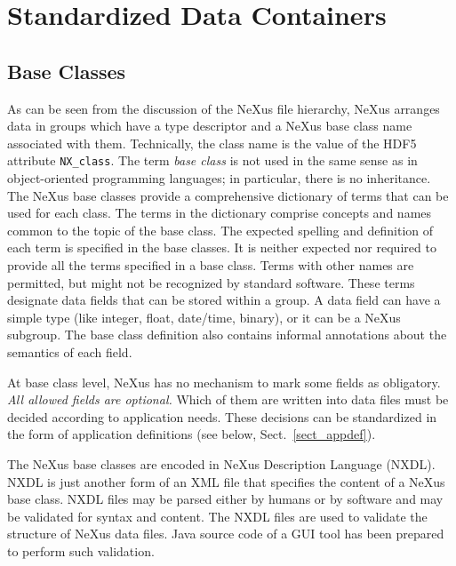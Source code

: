 \documentclass[%
 aip,
rsi,
 amsmath,amssymb,
 reprint,%
]{revtex4-1}
\begin{document}
\section{Standardized Data Containers}

\subsection{Base Classes}

As can be seen from the discussion of the NeXus file hierarchy, 
NeXus arranges data in groups which have a 
type descriptor and a NeXus base class name associated with them.
Technically, the class name is the value of the HDF5 attribute \texttt{NX\_class}.
The term \emph{base class} is not used in the same sense as in  
object-oriented programming languages; in particular, there is no inheritance.
The NeXus base classes provide a comprehensive dictionary of terms 
that can be used for each class. 
The terms in the dictionary comprise concepts and names common to the topic of the base class.
The expected spelling and definition of each term is specified in the base classes. 
It is neither expected nor required to provide all the terms specified in a base class. 
Terms with other names are permitted, but might not be recognized by standard software.
These terms designate data fields that can be stored within a group.
A data field can have a simple type (like integer, float, date/time, binary),
or it can be a NeXus subgroup.
The base class definition also contains informal annotations
about the semantics of each field.

At base class level, NeXus has no mechanism to mark some fields as obligatory.
\emph{All allowed fields are optional.}
Which of them are written into data files must be decided
according to application needs.
These decisions can be standardized in the form of
application definitions (see below, Sect.~\ref{sect_appdef}).

The NeXus base classes are encoded in NeXus Description Language (NXDL)\cite{nxman}. NXDL is 
just another form of an XML file that specifies the content of a NeXus base class. 
NXDL files may be parsed either by humans or by software and 
may be validated for syntax and content.  The NXDL files are used to validate the structure of
NeXus data files. Java source code of a GUI tool has been prepared\cite{nxvalidate} to perform such validation.%
\end{document}
